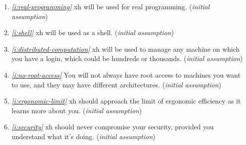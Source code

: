 \documentclass{report}
\makeatletter
\newcommand*{\Label}[2]{%
  \@bsphack
  \begingroup
    \label{#1-original}%
    \def\@currentlabel{#2}%
    \label{#1}%
  \endgroup
  \@esphack
}
\newcommand{\initial}{{\em initial assumption}}
\makeatother
\begin{document}
\begin{enumerate}
\item{}\Label{i:real-programming}{realprog}{\em\ref{i:real-programming}}
  xh will be used for real programming.
(\initial)
\item{}\Label{i:shell}{shell}{\em\ref{i:shell}}
  xh will be used as a shell.
(\initial)
\item{}\Label{i:distributed-computation}{distributed}{\em\ref{i:distributed-computation}}
  xh will be used to manage any machine on which you have a login, which
  could be hundreds or thousands.
(\initial)
\item{}\Label{i:no-root-access}{noroot}{\em\ref{i:no-root-access}}
  You will not always have root access to machines you want to use, and
  they may have different architectures.
(\initial)
\item{}\Label{i:ergonomic-limit}{ergonomic}{\em\ref{i:ergonomic-limit}}
  xh should approach the limit of ergonomic efficiency as it learns more
  about you.
(\initial)
\item{}\Label{i:security}{security}{\em\ref{i:security}}
  xh should never compromise your security, provided you understand what
  it's doing.
(\initial)


\end{enumerate}
\end{document}
